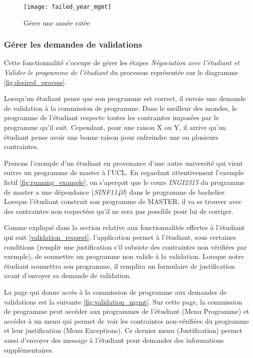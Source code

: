 \begin{figure}
\centering
\caption{Gérer une année ratée}
\label{fig:failed_year_mgmt}
\texttt{[image: failed\_year\_mgmt]}
\end{figure}

\subsubsection{Gérer les demandes de validations}
Cette fonctionnalité s'occupe de gérer les étapes \textit{Négociation avec l'étudiant et Valider le programme de l'étudiant} du processus représentée sur le diagramme \ref{fig:desired_process}. 

Lorsqu'un étudiant pense que son programme est correct, il envoie une demande de validation à la commission de programme. Dans le meilleur des mondes, le programme de l'étudiant respecte toutes les contraintes imposées par le programme qu'il suit. Cependant, pour une raison X ou Y, il arrive qu'un étudiant pense avoir une bonne raison pour enfreindre une ou plusieurs contraintes.

Prenons l'exemple d'un étudiant en provenance d'une autre université qui vient suivre un programme de master à l'UCL. En regardant attentivement l'exemple fictif \ref{fig:running_example}, on s’aperçoit que le cours \textit{INGI2315} du programme de master a une dépendance (\textit{SINF1140}) dans le programme de bachelier. Lorsque l'étudiant construit son programme de MASTER, il va se trouver avec des contraintes non respectées qu'il ne sera pas possible pour lui de corriger. 

Comme expliqué dans la section relative aux fonctionnalités offertes à l'étudiant qui suit \ref{validation_request}, l'application permet à l'étudiant, sous certaines conditions (remplir une justification s'il subsiste des contraintes non vérifiées par exemple), de soumettre un programme non valide à la validation. Lorsque notre étudiant soumettra son programme, il remplira un formulaire de justification avant d'envoyer sa demande de validation.

La page qui donne accès à la commission de programme aux demandes de validations est la suivante \ref{fig:validation_mgmt}. Sur cette page, la commission de programme peut accéder aux programmes de l'étudiant (Menu Programme) et accéder à un menu qui permet de voir les contraintes non-vérifiées du programme et leur justification (Menu Exceptions). Ce dernier menu (Justification) permet aussi d'envoyer des message à l'étudiant pour demander des informations supplémentaires.

